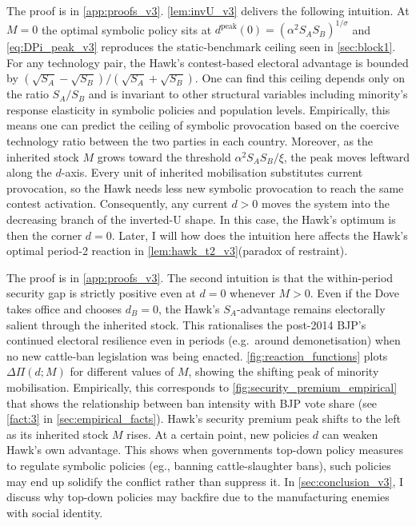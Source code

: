 \documentclass[11pt,twoside]{extarticle}
\begin{document}
The proof is in \autoref{app:proofs_v3}.
\autoref{lem:invU_v3} delivers the following intuition. At $M=0$ the optimal symbolic policy sits at $d^{\mathrm{peak}}(0)=(\alpha^2 S_A S_B)^{1/\sigma}$ and \eqref{eq:DPi_peak_v3} reproduces the static-benchmark ceiling seen in \autoref{sec:block1}. 
For any technology pair, the Hawk's contest-based electoral advantage is bounded by $(\sqrt{S_A}-\sqrt{S_B})/(\sqrt{S_A}+\sqrt{S_B})$.
One can find this ceiling depends only on the ratio $S_A/S_B$ and is invariant to other structural variables including minority's response elasticity in symbolic policies and population levels. 
Empirically, this means one can predict the ceiling of symbolic provocation based on the coercive technology ratio between the two parties in each country.
Moreover, as the inherited stock $M$ grows toward the threshold $\alpha^2 S_A S_B/\xi$, the peak moves leftward along the $d$-axis. 
Every unit of inherited mobilisation substitutes current provocation, so the Hawk needs less new symbolic provocation to reach the same contest activation. 
Consequently, any current $d>0$ moves the system into the decreasing branch of the inverted-U shape. 
In this case, the Hawk's optimum is then the corner $d=0$. 
Later, I will how does the intuition here affects the Hawk's optimal period-2 reaction in \autoref{lem:hawk_t2_v3}(paradox of restraint).

The proof is in \autoref{app:proofs_v3}.
The second intuition is that the within-period security gap is strictly positive even at $d=0$ whenever $M>0$.
Even if the Dove takes office and chooses $d_B=0$, the Hawk's $S_A$-advantage remains electorally salient through the inherited stock.
This rationalises the post-2014 BJP's continued electoral resilience even in periods (e.g.\ around demonetisation) when no new cattle-ban legislation was being enacted. 
\autoref{fig:reaction_functions} plots $\Delta\Pi(d;M)$ for different values of $M$, showing the shifting peak of minority mobilisation. 
Empirically, this corresponds to \autoref{fig:security_premium_empirical} that shows the relationship between ban intensity with BJP vote share (see \autoref{fact:3} in \autoref{sec:empirical_facts}). 
Hawk's security premium peak shifts to the left as its inherited stock $M$ rises. At a certain point, new policies $d$ can weaken Hawk's own advantage. 
This shows when governments top-down policy measures to regulate symbolic policies (eg., banning cattle-slaughter bans), such policies may end up solidify the conflict rather than suppress it. In \autoref{sec:conclusion_v3}, I discuss why top-down policies may backfire due to the manufacturing enemies with social identity.
\end{document}
